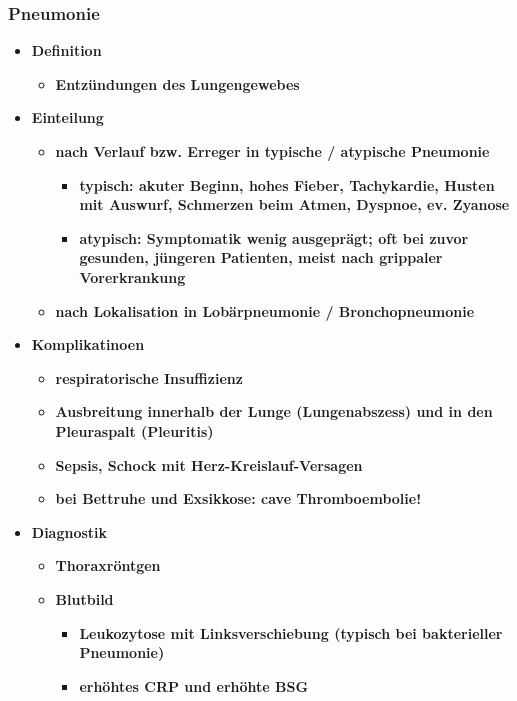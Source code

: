 	\subsubsection{Pneumonie}
		\begin{itemize}
			\item \textbf{Definition}
				\begin{itemize}
					\item \textbf{Entzündungen des Lungengewebes}
				\end{itemize}
			\item \textbf{Einteilung}
				\begin{itemize}
					\item \textbf{nach Verlauf bzw. Erreger in typische / atypische Pneumonie}
						\begin{itemize}
							\item \textbf{typisch: akuter Beginn, hohes Fieber, Tachykardie, Husten mit Auswurf, Schmerzen beim Atmen, Dyspnoe, ev. Zyanose}
							\item \textbf{atypisch: Symptomatik wenig ausgeprägt; oft bei zuvor gesunden, jüngeren Patienten, meist nach grippaler Vorerkrankung}
						\end{itemize}
					\item \textbf{nach Lokalisation in Lobärpneumonie / Bronchopneumonie}
				\end{itemize}
			\item \textbf{Komplikatinoen}
				\begin{itemize}
					\item \textbf{respiratorische Insuffizienz}
					\item \textbf{Ausbreitung innerhalb der Lunge (Lungenabszess) und in den Pleuraspalt (Pleuritis)}
					\item \textbf{Sepsis, Schock mit Herz-Kreislauf-Versagen}
					\item \textbf{bei Bettruhe und Exsikkose: cave Thromboembolie!}
				\end{itemize}
			\item \textbf{Diagnostik}
				\begin{itemize}
					\item \textbf{Thoraxröntgen}
					\item \textbf{Blutbild}
						\begin{itemize}
							\item \textbf{Leukozytose mit Linksverschiebung (typisch bei bakterieller Pneumonie)}
							\item \textbf{erhöhtes CRP und erhöhte BSG}

\end{itemize}
\end{itemize}
\end{itemize}

